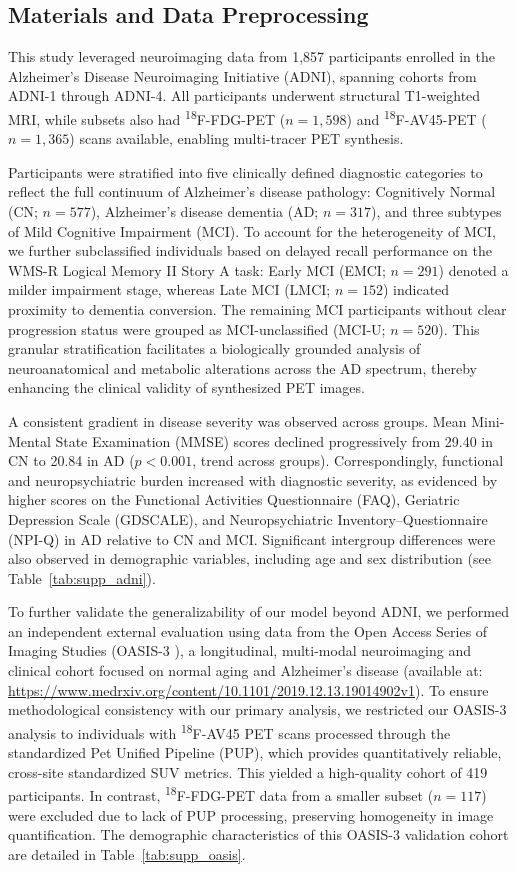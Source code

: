 \documentclass{article}
\begin{document}
\subsection{Materials and Data Preprocessing}
This study leveraged neuroimaging data from 1,857 participants enrolled in the Alzheimer’s Disease Neuroimaging Initiative (ADNI), spanning cohorts from ADNI-1 through ADNI-4. All participants underwent structural T1-weighted MRI, while subsets also had \textsuperscript{18}F-FDG-PET ($n = 1,598$) and \textsuperscript{18}F-AV45-PET ($n = 1,365$) scans available, enabling multi-tracer PET synthesis.

Participants were stratified into five clinically defined diagnostic categories to reflect the full continuum of Alzheimer’s disease pathology: Cognitively Normal (CN; $n = 577$), Alzheimer’s disease dementia (AD; $n = 317$), and three subtypes of Mild Cognitive Impairment (MCI). To account for the heterogeneity of MCI, we further subclassified individuals based on delayed recall performance on the WMS-R Logical Memory II Story A task: Early MCI (EMCI; $n = 291$) denoted a milder impairment stage, whereas Late MCI (LMCI; $n = 152$) indicated proximity to dementia conversion. The remaining MCI participants without clear progression status were grouped as MCI-unclassified (MCI-U; $n = 520$). This granular stratification facilitates a biologically grounded analysis of neuroanatomical and metabolic alterations across the AD spectrum, thereby enhancing the clinical validity of synthesized PET images.

A consistent gradient in disease severity was observed across groups. Mean Mini-Mental State Examination (MMSE) scores declined progressively from 29.40 in CN to 20.84 in AD ($p < 0.001$, trend across groups). Correspondingly, functional and neuropsychiatric burden increased with diagnostic severity, as evidenced by higher scores on the Functional Activities Questionnaire (FAQ), Geriatric Depression Scale (GDSCALE), and Neuropsychiatric Inventory–Questionnaire (NPI-Q) in AD relative to CN and MCI. Significant intergroup differences were also observed in demographic variables, including age and sex distribution (see Table~\ref{tab:supp_adni}).

To further validate the generalizability of our model beyond ADNI, we performed an independent external evaluation using data from the Open Access Series of Imaging Studies (OASIS-3 ), a longitudinal, multi-modal neuroimaging and clinical cohort focused on normal aging and Alzheimer’s disease (available at: \url{https://www.medrxiv.org/content/10.1101/2019.12.13.19014902v1}). To ensure methodological consistency with our primary analysis, we restricted our OASIS-3 analysis to individuals with \textsuperscript{18}F-AV45 PET scans processed through the standardized Pet Unified Pipeline (PUP), which provides quantitatively reliable, cross-site standardized SUV metrics. This yielded a high-quality cohort of 419 participants. In contrast, \textsuperscript{18}F-FDG-PET data from a smaller subset ($n = 117$) were excluded due to lack of PUP processing, preserving homogeneity in image quantification. The demographic characteristics of this OASIS-3 validation cohort are detailed in Table~\ref{tab:supp_oasis}.
\end{document}
